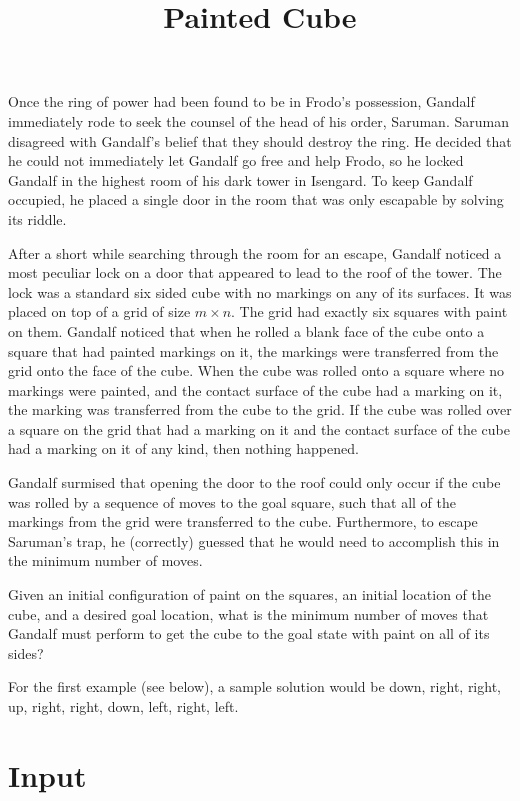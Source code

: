 \documentclass{article}
\title{Painted Cube}
\date{}
\begin{document}
\maketitle

Once the ring of power had been found to be in Frodo's possession, 
Gandalf immediately rode to seek the counsel of the head of his order, Saruman. 
Saruman disagreed with Gandalf's belief that they should destroy the ring.  
He decided that he could not immediately let Gandalf go free and help Frodo,
so he locked Gandalf in the highest room of his dark tower in Isengard.  To
keep Gandalf occupied, he placed a single door in the room that was only 
escapable by solving its riddle.

After a short while searching through the room for an escape, Gandalf noticed 
a most peculiar lock on a door that appeared to lead to the roof of the tower. 
The lock was a standard six sided cube with no markings on any of its surfaces.  
It was placed on top of a grid of size $m \times n$. The grid had exactly six
squares with paint on them. Gandalf noticed that when he rolled a blank face 
of the cube onto a square that had painted markings on it, the markings were 
transferred from the grid onto the face of the cube. When the cube was rolled 
onto a square where no markings were painted, and the contact surface of the 
cube had a marking on it, the marking was transferred from the cube to the 
grid.  If the cube was rolled over a square on the grid that had a marking 
on it and the contact surface of the cube had a marking on it of any kind, 
then nothing happened. 

Gandalf surmised that opening the door to the roof could only occur if
the cube was rolled by a sequence of moves to the goal square, such that
all of the markings from the grid were transferred 
to the cube.  Furthermore, to escape Saruman's trap, he (correctly) guessed 
that he would need to accomplish this in the minimum number of moves.

Given an initial configuration of paint on the squares, an initial location
of the cube, and a desired goal location, what is the minimum number of moves
that Gandalf must perform to get the cube to the goal state with paint on all
of its sides?

For the first example (see below), a sample solution would be down, right,
right, up, right, right, down, left, right, left.

\section{Input}
\end{document}
